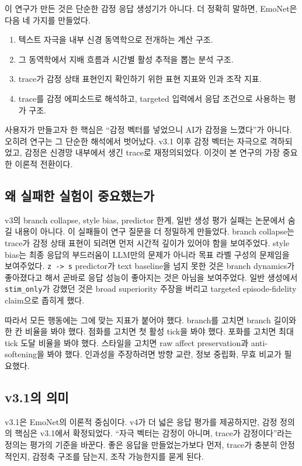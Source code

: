 \documentclass[11pt,a4paper]{article}
\newcommand{\eng}[1]{\texttt{#1}}
\begin{document}
이 연구가 만든 것은 단순한 감정 응답 생성기가 아니다. 더 정확히 말하면, EmoNet은 다음 네 가지를 만들었다.

\begin{enumerate}
  \item 텍스트 자극을 내부 신경 동역학으로 전개하는 계산 구조.
  \item 그 동역학에서 지배 흐름과 시간별 활성 추적을 뽑는 분석 구조.
  \item trace가 감정 상태 표현인지 확인하기 위한 표현 지표와 인과 조작 지표.
  \item trace를 감정 에피소드로 해석하고, targeted 입력에서 응답 조건으로 사용하는 평가 구조.
\end{enumerate}

사용자가 만들고자 한 핵심은 ``감정 벡터를 넣었으니 AI가 감정을 느꼈다''가 아니다. 오히려 연구는 그 단순한 해석에서 벗어났다. v3.1 이후 감정 벡터는 자극으로 격하되었고, 감정은 신경망 내부에서 생긴 trace로 재정의되었다. 이것이 본 연구의 가장 중요한 이론적 전환이다.

\subsection{왜 실패한 실험이 중요했는가}

v3의 branch collapse, style bias, predictor 한계, 일반 생성 평가 실패는 논문에서 숨길 내용이 아니다. 이 실패들이 연구 질문을 더 정밀하게 만들었다. branch collapse는 trace가 감정 상태 표현이 되려면 먼저 시간적 깊이가 있어야 함을 보여주었다. style bias는 최종 응답의 부드러움이 LLM만의 문제가 아니라 목표 라벨 구성의 문제임을 보여주었다. \eng{z -> s} predictor가 text baseline을 넘지 못한 것은 branch dynamics가 좋아졌다고 해서 곧바로 응답 성능이 좋아지는 것은 아님을 보여주었다. 일반 생성에서 \eng{stim\_only}가 강했던 것은 broad superiority 주장을 버리고 targeted episode-fidelity claim으로 좁히게 했다.

따라서 모든 행동에는 그에 맞는 지표가 붙어야 했다. branch를 고치면 branch 길이와 한 칸 비율을 봐야 했다. 점화를 고치면 첫 활성 tick을 봐야 했다. 포화를 고치면 최대 tick 도달 비율을 봐야 했다. 스타일을 고치면 raw affect preservation과 anti-softening을 봐야 했다. 인과성을 주장하려면 방향 교란, 정보 중립화, 무효 비교가 필요했다.

\subsection{v3.1의 의미}

v3.1은 EmoNet의 이론적 중심이다. v4가 더 넓은 응답 평가를 제공하지만, 감정 정의의 핵심은 v3.1에서 확정되었다. ``자극 벡터는 감정이 아니며, trace가 감정이다''라는 정의는 평가의 기준을 바꾼다. 좋은 응답을 만들었는가보다 먼저, trace가 충분히 안정적인지, 감정축 구조를 담는지, 조작 가능한지를 묻게 된다.
\end{document}
